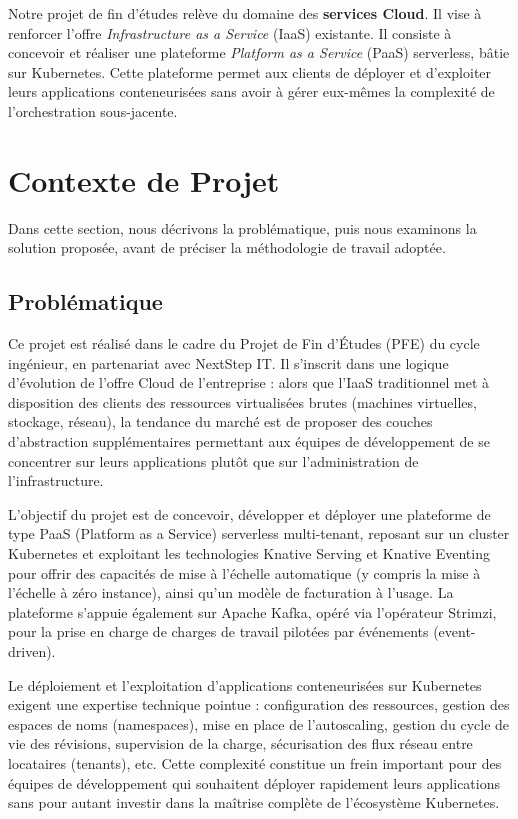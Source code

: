 Notre projet de fin d'études relève du domaine des \textbf{services Cloud}. Il vise à renforcer l'offre \textit{Infrastructure as a Service} (IaaS) existante. Il consiste à concevoir et réaliser une plateforme \textit{Platform as a Service} (PaaS) serverless, bâtie sur Kubernetes. Cette plateforme permet aux clients de déployer et d'exploiter leurs applications conteneurisées sans avoir à gérer eux-mêmes la complexité de l'orchestration sous-jacente.




\section{Contexte de Projet}

Dans cette section, nous décrivons la problématique, puis nous examinons la solution proposée, avant de préciser la méthodologie de travail adoptée.

\subsection{Problématique}

Ce projet est réalisé dans le cadre du Projet de Fin d'Études (PFE) du cycle ingénieur, en partenariat avec NextStep IT. Il s'inscrit dans une logique d'évolution de l'offre Cloud de l'entreprise : alors que l'IaaS traditionnel met à disposition des clients des ressources virtualisées brutes (machines virtuelles, stockage, réseau), la tendance du marché est de proposer des couches d'abstraction supplémentaires permettant aux équipes de développement de se concentrer sur leurs applications plutôt que sur l'administration de l'infrastructure.

\vspace{0.3cm}

L'objectif du projet est de concevoir, développer et déployer une plateforme de type PaaS (Platform as a Service) serverless multi-tenant, reposant sur un cluster Kubernetes et exploitant les technologies Knative Serving et Knative Eventing pour offrir des capacités de mise à l'échelle automatique (y compris la mise à l'échelle à zéro instance), ainsi qu'un modèle de facturation à l'usage. La plateforme s'appuie également sur Apache Kafka, opéré via l'opérateur Strimzi, pour la prise en charge de charges de travail pilotées par événements (event-driven).

\vspace{0.3cm}

Le déploiement et l'exploitation d'applications conteneurisées sur Kubernetes exigent une expertise technique pointue : configuration des ressources, gestion des espaces de noms (namespaces), mise en place de l'autoscaling, gestion du cycle de vie des révisions, supervision de la charge, sécurisation des flux réseau entre locataires (tenants), etc. Cette complexité constitue un frein important pour des équipes de développement qui souhaitent déployer rapidement leurs applications sans pour autant investir dans la maîtrise complète de l'écosystème Kubernetes.

